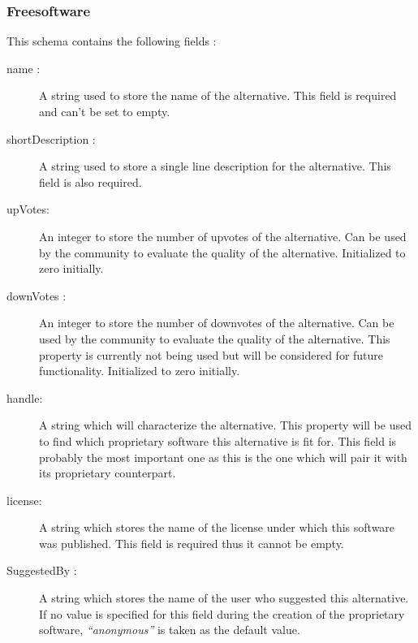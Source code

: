 \medskip

\subsubsection{Freesoftware}
This schema contains the following fields :

\begin{description}

    \item[name : ]
          A string used to store the name of the alternative. This field is required and can’t be set to empty.

    \item[shortDescription : ]
          A string used to store a single line description for the alternative. This field is also required.

    \item[upVotes:]
          An integer to store the number of upvotes of the alternative. Can be used by the community to evaluate the quality of the alternative. Initialized to zero initially.

    \item[downVotes : ]
          An integer to store the number of downvotes of the alternative. Can be used by the community to evaluate the quality of the alternative. This property is currently not being used but will be considered for future functionality. Initialized to zero initially.

    \item[handle:]
          A string which will characterize the alternative. This property will be used to find which proprietary software this alternative is fit for. This field is probably the most important one as this is the one which will pair it with its proprietary counterpart.

    \item[license:]
          A string which stores the name of the license under which this software was published. This field is required thus it cannot be empty.

    \item[SuggestedBy : ]
          A string which stores the name of the user who suggested this alternative. If no value is specified for this field during the creation of the proprietary software, \textsl{“anonymous”} is taken as the default value.

\end{description}

\medskip

